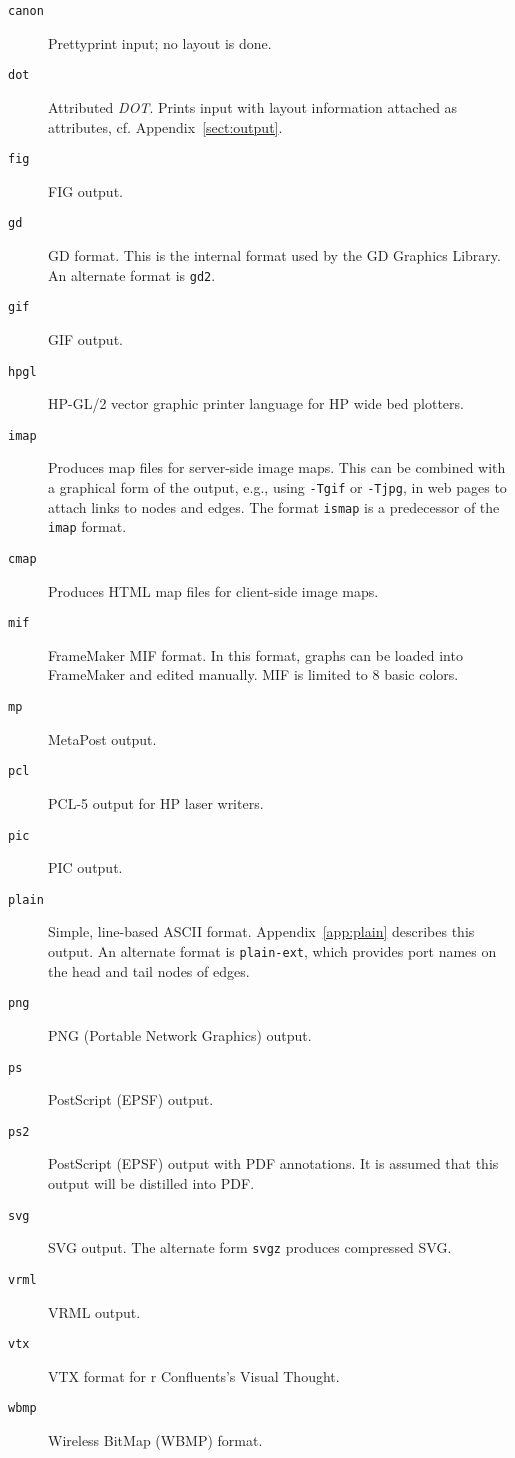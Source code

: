 \documentclass[11pt]{article}
\def\DOT{{\it DOT}}
\begin{document}
\begin{description}
\item[{\tt canon}]
Prettyprint input; no layout is done.
\item[{\tt dot}] 
Attributed \DOT. Prints input with layout information attached as
attributes, cf. Appendix~\ref{sect:output}.
\item[{\tt fig}] FIG output.
\item[{\tt gd}] GD format. This is the internal format used by the GD Graphics
Library. An alternate format is {\tt gd2}.
\item[{\tt gif}] GIF output.
\item[{\tt hpgl}] HP-GL/2 vector graphic printer language for HP wide bed
plotters.
\item[{\tt imap}] Produces map files for server-side image 
maps. This can be combined with a graphical form of the output, e.g., using
{\tt -Tgif} or {\tt -Tjpg}, in web pages to attach links to nodes and edges. 
The format {\tt ismap} is a predecessor of the {\tt imap} format.
\item[{\tt cmap}] Produces HTML map files for client-side image maps.
\item[{\tt mif}] FrameMaker MIF format. In this format, graphs can be
loaded into FrameMaker and edited manually. MIF is limited to 8 basic colors.
\item[{\tt mp}] MetaPost output.
\item[{\tt pcl}] PCL-5 output for HP laser writers.
\item[{\tt pic}] PIC output.
\item[{\tt plain}] Simple, line-based ASCII format. Appendix~\ref{app:plain}
describes this output. An alternate format is {\tt plain-ext}, which 
provides port names on the head and tail nodes of edges.
\item[{\tt png}] PNG (Portable Network Graphics) output.
\item[{\tt ps}] PostScript (EPSF) output.
\item[{\tt ps2}] PostScript (EPSF) output with PDF annotations. It is
assumed that this output will be distilled into PDF.
\item[{\tt svg}] SVG output. The alternate form {\tt svgz} produces
compressed SVG.
\item[{\tt vrml}] VRML output.
\item[{\tt vtx}] VTX format for r Confluents's Visual Thought. 
\item[{\tt wbmp}] Wireless BitMap (WBMP) format.
\end{description}
\end{document}
